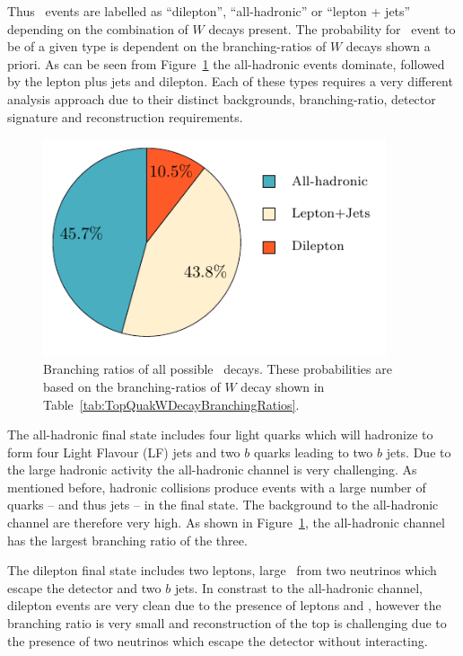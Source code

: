 Thus \ttbar\ events are labelled as ``dilepton'', ``all-hadronic'' or ``lepton + jets'' depending on the combination of $W$ decays present. The probability for \ttbar\ event to be of a given type is dependent on the branching-ratios of $W$ decays shown a priori. As can be seen from Figure~\ref{fig:TopQuarkDecayModes} the all-hadronic events dominate, followed by the lepton plus jets and dilepton. Each of these types requires a very different analysis approach due to their distinct backgrounds, branching-ratio, detector signature and reconstruction requirements.

\begin{figure}[tbhp]
  \centering
  \includegraphics[width=0.90\textwidth]{PartTopQuark/Diagrams/TopQuarkDecayPie.pdf}
  \caption{Branching ratios of all possible \ttbar\ decays. These probabilities are based on the branching-ratios of $W$ decay shown in Table~\ref{tab:TopQuakWDecayBranchingRatios}.}
  \label{fig:TopQuarkDecayModes}
\end{figure}

The all-hadronic final state includes four light quarks which will hadronize to form four Light Flavour (LF) jets and two $b$ quarks leading to two $b$ jets. Due to the large hadronic activity the all-hadronic channel is very challenging. As mentioned before, hadronic collisions produce events with a large number of quarks -- and thus jets -- in the final state. The background to the all-hadronic channel are therefore very high. As shown in Figure~\ref{fig:TopQuarkDecayModes}, the all-hadronic channel has the largest branching ratio of the three.

The dilepton final state includes two leptons, large \met\ from two neutrinos which escape the detector and two $b$ jets. In constrast to the all-hadronic channel, dilepton events are very clean due to the presence of leptons and \met, however the branching ratio is very small and reconstruction of the top is challenging due to the presence of two neutrinos which escape the detector without interacting.

